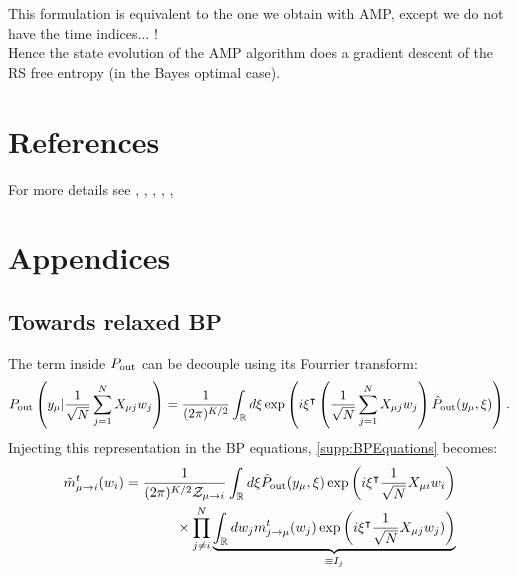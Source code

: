 \documentclass[aip,jmp,amsmath,amssymb,reprint]{revtex4}
\begin{document}
This formulation is equivalent to the one we obtain with AMP\Eq{\ref{amp_state_evolution}}, except we do not have the time indices... !\\
Hence the state evolution of the AMP algorithm does a gradient descent of the RS free entropy (in the Bayes optimal case). 







\newpage
\nocite{}
\section{References}


 For more details see \cite{Mezard1987}, \cite{Barbier2017b}, \cite{Krzakala2012}, \cite{Aubin2018}, \cite{Yedidia2001}, \cite{Castellani2005}





\newpage
\newpage
\section{\color{red} \Large Appendices}


\subsection{Towards relaxed BP}
\label{appendix:towardsrBP}
The term inside $P_{\rm out}$ can be decouple using its Fourrier transform:
\begin{equation*}
P_{\rm out}\left (y_{\mu} | \displaystyle \frac{1}{\sqrt{N}} \sum_{j=1}^N  X_{\mu j}w_{j} \right) = \frac{1}{(2\pi)^{K/2}}
\int_{\mathbb{R}} d \xi \exp\left( i \xi^\intercal \left( \displaystyle \frac{1}{\sqrt{N}} \sum_{j=1}^N  X_{\mu j}w_{j}\right) \hat{P}_{\rm out}(y_{\mu} , \xi )    \right).	
\end{equation*}
Injecting this representation in the BP equations, \eqref{supp:BPEquations} becomes:
\begin{align*}
&\tilde{m}_{\mu \to i}^t (w_i ) = 
\frac{1}{(2\pi)^{K/2}\mathcal{Z}_{\mu\to i} }
\int_{\mathbb{R}} d\xi \hat{P}_{\rm out}(y_{\mu} , \xi)  
\exp\left(i  \xi^\intercal \frac{1}{\sqrt{N}} X_{\mu i} w_i \right)\nonumber\\
 &\qquad\qquad\qquad\qquad\times\prod\limits_{j\neq i}^N  \underbrace{\int_{\mathbb{R}} dw_j 
		 m_{j \to \mu}^t (w_j ) \exp\left( i  \xi^\intercal \frac{1}{\sqrt{N}} X_{\mu j} w_j ) \right)}_{\equiv I_j}
		 \label{mtilde}
\end{align*}
\end{document}

